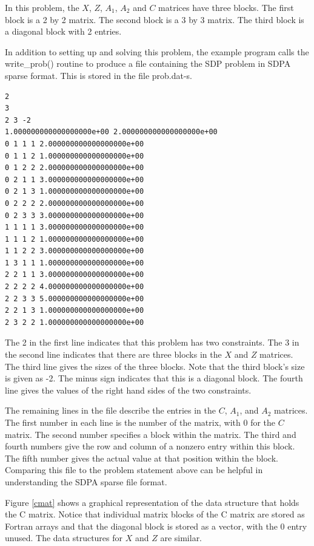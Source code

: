 \documentclass{article}
\begin{document}
In this problem, the $X$, $Z$, $A_{1}$, $A_{2}$ and $C$ matrices have
three blocks.  The first block is a 2 by 2 matrix.  The second block
is a 3 by 3 matrix.  The third block is a diagonal block with 2
entries.  

In addition to setting up and solving this problem, the example
program calls the write\_prob() routine to produce a file containing
the SDP problem in SDPA sparse format.  This is stored in the file
prob.dat-s.  

\begin{verbatim}
2 
3 
2 3 -2 
1.000000000000000000e+00 2.000000000000000000e+00 
0 1 1 1 2.000000000000000000e+00 
0 1 1 2 1.000000000000000000e+00 
0 1 2 2 2.000000000000000000e+00 
0 2 1 1 3.000000000000000000e+00 
0 2 1 3 1.000000000000000000e+00 
0 2 2 2 2.000000000000000000e+00 
0 2 3 3 3.000000000000000000e+00 
1 1 1 1 3.000000000000000000e+00 
1 1 1 2 1.000000000000000000e+00 
1 1 2 2 3.000000000000000000e+00 
1 3 1 1 1.000000000000000000e+00 
2 2 1 1 3.000000000000000000e+00 
2 2 2 2 4.000000000000000000e+00 
2 2 3 3 5.000000000000000000e+00 
2 2 1 3 1.000000000000000000e+00 
2 3 2 2 1.000000000000000000e+00 
\end{verbatim}
The 2 in the first line indicates that this problem has two constraints.
The 3 in the second line indicates that there are three blocks in the $X$
and $Z$ matrices.  The third line gives the sizes of the three blocks.  Note
that the third block's size is given as -2.  The minus sign indicates that
this is a diagonal block.  The fourth line gives the values of the right
hand sides of the two constraints.  

The remaining lines in the file describe the entries in the $C$,
$A_{1}$, and $A_{2}$ matrices.  The first number in each line is the
number of the matrix, with $0$ for the $C$ matrix.  The second number
specifies a block within the matrix.  The third and fourth numbers give
the row and column of a nonzero entry within this block.  The fifth number
gives the actual value at that position within the block.  
Comparing this file to the problem statement above
can be helpful in understanding the SDPA sparse file format.

Figure \ref{cmat} shows a graphical representation of the
data structure that holds the C matrix.  Notice that individual matrix
blocks of the C matrix are stored as Fortran arrays and that the
diagonal block is stored as a vector, with the 0 entry unused.  The data
structures for $X$ and $Z$ are similar.  
  
\end{document}
